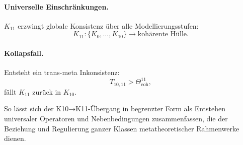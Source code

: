\paragraph{Universelle Einschränkungen.}
$K_{11}$ erzwingt globale Konsistenz über alle Modellierungsstufen:
\[
K_{11} : \{K_0,\dots,K_{10}\} \rightarrow \text{kohärente Hülle}.
\]

\paragraph{Kollapsfall.}
Entsteht ein trans-meta Inkonsistenz:
\[
T_{10,11} > \Theta^{11}_{\mathrm{coh}},
\]
fällt $K_{11}$ zurück in $K_{10}$.

So lässt sich der K10→K11-Übergang in begrenzter Form als Entstehen
universaler Operatoren und Nebenbedingungen zusammenfassen, die der Beziehung und
Regulierung ganzer Klassen metatheoretischer Rahmenwerke dienen.
